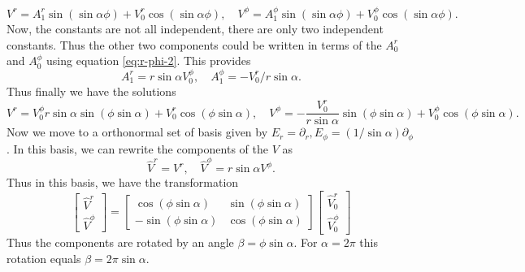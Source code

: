 \documentclass[fleqn]{article}
\begin{document}
\begin{equation}
  \label{eq:r-phi-solution-2}
  \boxed{V^r = A^r_1 \sin(\sin\alpha \phi) + V^r_0 \cos(\sin\alpha \phi),\quad V^\phi = A^\phi_1 \sin(\sin\alpha \phi) + V^\phi_0 \cos(\sin\alpha \phi)}.
\end{equation}
Now, the constants are not all independent, there are only two independent constants. Thus the other two components could be written in terms of the $A^r_0$ and $A^\phi_0$ using equation \eqref{eq:r-phi-2}. This provides
\begin{equation}
  \label{eq:constants}
  A^r_1 = r \sin\alpha V^\phi_0,\quad A^\phi_1 = - V^r_0/r\sin\alpha.
\end{equation}
Thus finally we have the solutions
\begin{equation}
  \label{eq:r-phi-solution-final}
  \boxed{V^r =  V^\phi_0 r \sin\alpha \sin(\phi\sin\alpha) + V^r_0 \cos(\phi\sin\alpha),\quad V^\phi =  - \frac{V^r_0}{r\sin\alpha} \sin(\phi\sin\alpha) + V^\phi_0 \cos(\phi\sin\alpha)}.
\end{equation}
Now we move to a orthonormal set of basis given by $E_r = \partial_r, E_\phi = (1/\sin\alpha)\partial_\phi$. In this basis, we can rewrite the components of the $V$ as
\begin{equation}
  \label{eq:V-in-orthonormal}
  \hat{V}^r = V^r,\quad \hat{V}^\phi = r\sin\alpha V^\phi.
\end{equation}
Thus in this basis, we have the transformation
\begin{equation}
  \label{eq:transformation-orthonormal}
  \boxed{\begin{bmatrix}
      \hat{V}^r \\
      \hat{V}^\phi
    \end{bmatrix} =
    \begin{bmatrix}
      \cos(\phi\sin\alpha) & \sin(\phi\sin\alpha)\\
      -\sin(\phi\sin\alpha) & \cos(\phi\sin\alpha)
    \end{bmatrix}
    \begin{bmatrix}
      \hat{V}^r_0 \\
      \hat{V}^\phi_0
    \end{bmatrix}}
\end{equation}
Thus the components are rotated by an angle $\beta = \phi\sin\alpha$. For $\alpha = 2\pi$ this rotation equals $\beta = 2\pi\sin\alpha$.
\end{document}
